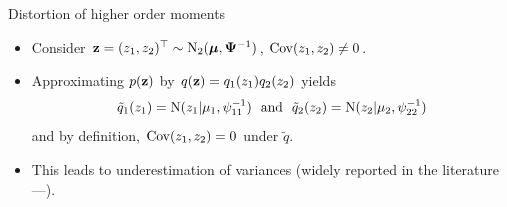 \begin{frame}{Distortion of higher order moments}
  \vspace{-11pt}
  \begin{figure}[t]
    \centering\hspace{-16pt}
  \end{figure}
  \vspace{-10pt}
  \begin{itemize}[<+->]
    \item Consider ${\mathbf z} = (z_{1}, z_{2})^\top \sim \operatorname{N}_2( {\bm\mu}, {\bm\Psi}^{-1})$, $\operatorname{Cov}(z_1,z_2) \neq 0$.
    \item Approximating $p({\mathbf z})$ by $q({\mathbf z}) = q_1(z_1)q_2(z_2)$ yields
    \[
      \tilde q_1(z_1) = \N(z_1|\mu_1,\psi_{11}^{-1}) \ \text{ and } \ \tilde q_2(z_2) = \N(z_2|\mu_2,\psi_{22}^{-1})
    \]
    and by definition, $\operatorname{Cov}(z_1,z_2) = 0$ under $\tilde q$.
    \item This leads to underestimation of variances (widely reported in the literature---\cite{zhao2013}).
  \end{itemize}
\end{frame}

